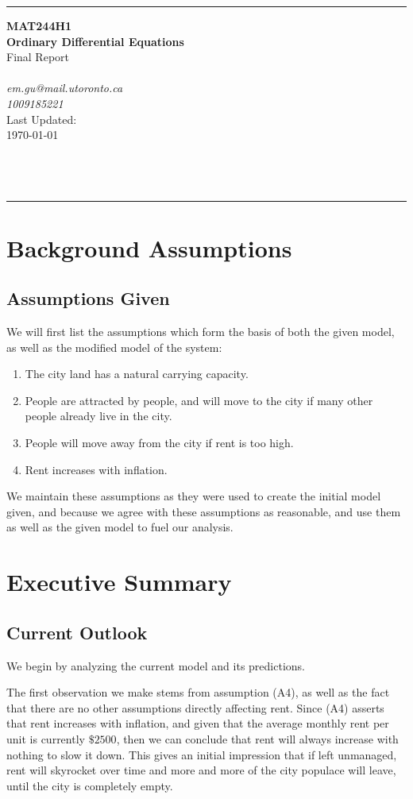 \documentclass{article}
\makeatletter
\def\coursecode{MAT244H1}
\def\coursename{Ordinary Differential Equations} %
\def\author{\me}
\def\updatedate{\today}
\def\source{} %
\def\sourceauthor{} %
\def\typetext{Final Report}
\newcommand*{\customcover}{
\begin{titlepage}
\newgeometry{top=1.5in}
\hrule
\vspace*{0.5in}
\centering\Huge\textbf{\coursecode} \\[0.1in]
\huge\textbf{\coursename} \\[0.3in]
\LARGE\textsf{\typetext} \\[1.1in]
\large\textit{\author} \\[0.1in]
\textit{em.gu@mail.utoronto.ca} \\[0.1in]
\textit{1009185221} \\[0.6in]
\normalsize Last Updated: \\[0.1in]
\updatedate \\[0.8in]
\Large \ \\[0.2in]
\large\textit{\source} \\[0.3in]
\Large \ \\[0.2in]
\large\textit{\sourceauthor}
\vspace*{1in}
\hrule
\restoregeometry
\end{titlepage}
}
\makeatother
\begin{document}
\customcover
\toc
{}


\section{Background Assumptions}
\subsection{Assumptions Given}

We will first list the assumptions which form the basis of both the given model, as well as the
modified model of the system:

\begin{enumerate}[label=(A\arabic*)]
    \item The city land has a natural carrying capacity.
    \item People are attracted by people, and will move to the city if many other people already
        live in the city.
    \item People will move away from the city if rent is too high.
    \item Rent increases with inflation.
\end{enumerate}

We maintain these assumptions as they were used to create the initial model given, and because we
agree with these assumptions as reasonable, and use them as well as the given model to fuel our
analysis.

\newpage
\section{Executive Summary}
\subsection{Current Outlook}

We begin by analyzing the current model and its predictions.

The first observation we make stems from assumption (A4), as well as the fact that there are no
other assumptions directly affecting rent. Since (A4) asserts that rent increases with inflation,
and given that the average monthly rent per unit is currently $ \$2500 $, then we can conclude that
rent will always increase with nothing to slow it down. This gives an initial impression that if
left unmanaged, rent will skyrocket over time and more and more of the city populace will leave,
until the city is completely empty.
\end{document}
